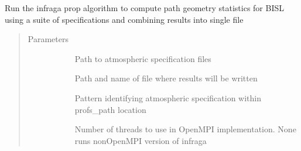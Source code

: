 \documentclass[letterpaper,10pt,english]{sphinxmanual}
\begin{document}
\begin{fulllineitems}
\label{\detokenize{stochprop.propagation:stochprop.propagation.run_infraga}}
\sphinxAtStartPar
Run the infraga \sphinxhyphen{}prop algorithm to compute path geometry
statistics for BISL using a suite of specifications
and combining results into single file
\begin{quote}\begin{description}
\item[{Parameters}] \leavevmode\begin{description}
\item[{}] \leavevmode
\sphinxAtStartPar
Path to atmospheric specification files

\item[{}] \leavevmode
\sphinxAtStartPar
Path and name of file where results will be written

\item[{}] \leavevmode
\sphinxAtStartPar
Pattern identifying atmospheric specification within profs\_path location

\item[{}] \leavevmode
\sphinxAtStartPar
Number of threads to use in OpenMPI implementation.  None runs non\sphinxhyphen{}OpenMPI version of infraga


\end{description}
\end{description}
\end{quote}
\end{fulllineitems}
\end{document}
